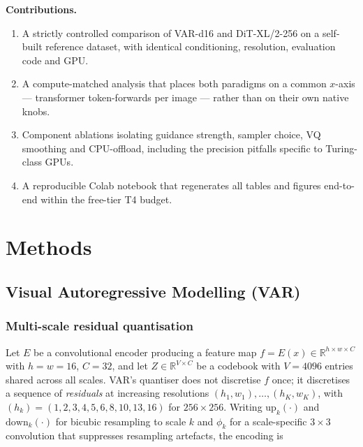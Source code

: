 \documentclass[conference]{IEEEtran}
\begin{document}
\textbf{Contributions.}
\begin{enumerate}
\item A strictly controlled comparison of VAR-d16 and DiT-XL/2-256 on a self-built
      reference dataset, with identical conditioning, resolution, evaluation code and GPU.
\item A compute-matched analysis that places both paradigms on a common $x$-axis ---
      transformer token-forwards per image --- rather than on their own native knobs.
\item Component ablations isolating guidance strength, sampler choice, VQ smoothing and
      CPU-offload, including the precision pitfalls specific to Turing-class GPUs.
\item A reproducible Colab notebook that regenerates all tables and figures end-to-end
      within the free-tier T4 budget.
\end{enumerate}

\section{Methods}

\subsection{Visual Autoregressive Modelling (VAR)}

\subsubsection{Multi-scale residual quantisation}
Let $E$ be a convolutional encoder producing a feature map $f = E(x) \in
\mathbb{R}^{h\times w\times C}$ with $h{=}w{=}16$, $C{=}32$, and let $Z \in
\mathbb{R}^{V\times C}$ be a codebook with $V{=}4096$ entries shared across all scales.
VAR's quantiser does not discretise $f$ once; it discretises a sequence of \emph{residuals}
at increasing resolutions $(h_1,w_1),\dots,(h_K,w_K)$, with
$(h_k){=}(1,2,3,4,5,6,8,10,13,16)$ for $256{\times}256$. Writing
$\mathrm{up}_k(\cdot)$ and $\mathrm{down}_k(\cdot)$ for bicubic resampling to scale $k$ and
$\phi_k$ for a scale-specific $3{\times}3$ convolution that suppresses resampling artefacts,
the encoding is
\end{document}
